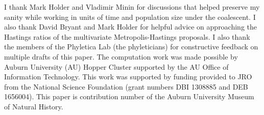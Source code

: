 I thank Mark Holder and Vladimir Minin for discussions that helped preserve my
sanity while working in units of time and population size under the coalescent.
I also thank David Bryant and Mark Holder for helpful advice on approaching the
Hastings ratios of the multivariate Metropolis-Hastings proposals.
I also thank the members of the Phyletica Lab (the phyleticians) for
constructive feedback on multiple drafts of this paper.
The computation work was made possible by Auburn University (AU) Hopper Cluster
supported by the AU Office of Information Technology.
This work was supported by funding provided to JRO from the National Science
Foundation (grant numbers DBI 1308885 and DEB 1656004).
This paper is contribution number  of the Auburn University
Museum of Natural History.

